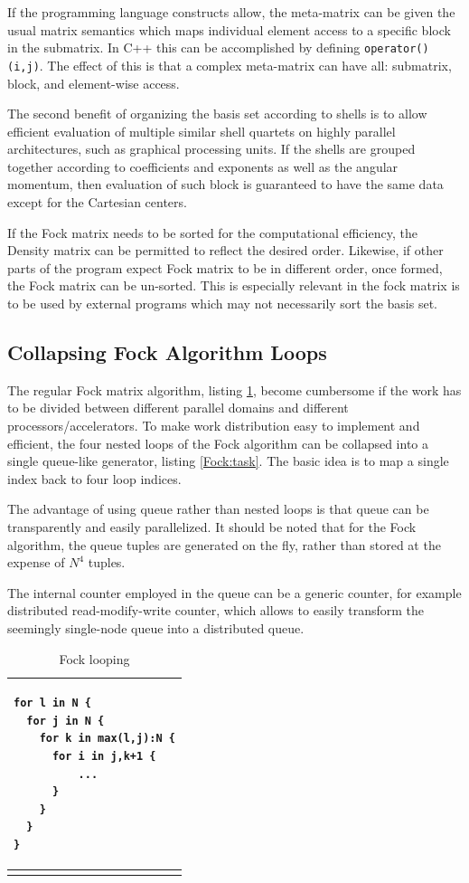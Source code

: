 \documentclass[12pt]{article}
\begin{document}
If the programming language constructs allow, the meta-matrix can be given the usual
matrix semantics which maps individual element access to a specific
block in the submatrix.  In C++ this can be accomplished by defining
{\tt operator()(i,j)}.  The effect of this is that a complex
meta-matrix can have all: submatrix, block, and element-wise access.

The second benefit of organizing the basis set according to shells is
to allow efficient evaluation of multiple similar shell quartets on
highly parallel architectures, such as graphical processing units.
If the shells are grouped together according to coefficients and
exponents as well as the angular momentum, then evaluation of such block is guaranteed
to have the same data except for the Cartesian centers.

If the Fock matrix needs to be sorted for the computational
efficiency, the Density matrix can be permitted to reflect the desired
order.  Likewise, if other parts of the program expect Fock matrix to
be in different order, once formed, the Fock matrix can be
un-sorted.  This is especially relevant in the fock matrix is to be used
by external programs which may not necessarily sort  the basis set.


\subsection*{Collapsing Fock Algorithm Loops}
The regular Fock matrix algorithm, listing \ref{Fock:loop},
become  cumbersome if the work has to be divided between
different parallel domains and different processors/accelerators.
To make work distribution easy to implement and efficient, the four
nested loops of the Fock algorithm can be collapsed into a single
queue-like generator, listing \ref{Fock:task}.  The basic idea is to
map a single index back to four loop indices.

The advantage of using queue rather than nested loops is that queue
can be transparently and easily parallelized.
It should be noted that for the Fock algorithm, the queue tuples are
generated on the fly, rather than stored at the expense of $N^4$ tuples.

The internal counter employed in the queue can be a generic counter, for
example distributed read-modify-write counter, which allows to easily
transform the seemingly single-node queue into a distributed queue.

\begin{table}
\begin{tabular}{ p{6in} }
\hline
\begin{verbatim}
for l in N {
  for j in N {
    for k in max(l,j):N {
      for i in j,k+1 {
          ...
      }
    }
  }
}
\end{verbatim} \\
\hline

\label{Fock:loop}
\caption{Fock looping}
\end{tabular}
\end{table}
\end{document}
